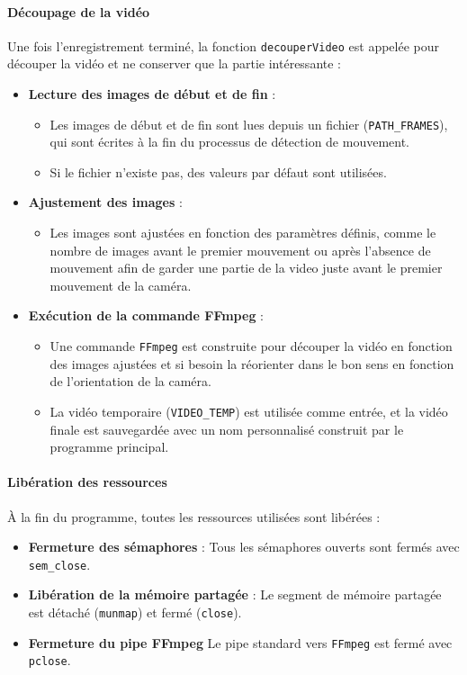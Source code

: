 \documentclass[a4paper, 11pt, french]{article}
\begin{document}
\paragraph{Découpage de la vidéo}
Une fois l'enregistrement terminé, la fonction \texttt{decouperVideo} est appelée pour découper la vidéo et ne conserver que la partie intéressante :
\begin{itemize}
    \item \textbf{Lecture des images de début et de fin} :
    \begin{itemize}
        \item Les images de début et de fin sont lues depuis un fichier (\texttt{PATH\_FRAMES}), qui sont écrites à la fin du processus de détection de mouvement.
        \item Si le fichier n'existe pas, des valeurs par défaut sont utilisées.
    \end{itemize}
    \item \textbf{Ajustement des images} :
    \begin{itemize}
        \item Les images sont ajustées en fonction des paramètres définis, comme le nombre de images avant le premier mouvement ou après l'absence de mouvement afin de garder une partie de la video juste avant le premier mouvement de la caméra. 
    \end{itemize}
    \item \textbf{Exécution de la commande FFmpeg} :
    \begin{itemize}
        \item Une commande \texttt{FFmpeg} est construite pour découper la vidéo en fonction des images ajustées et si besoin la réorienter dans le bon sens en fonction de l'orientation de la caméra.
        \item La vidéo temporaire (\texttt{VIDEO\_TEMP}) est utilisée comme entrée, et la vidéo finale est sauvegardée avec un nom personnalisé construit par le programme principal.
    \end{itemize}
\end{itemize}

\paragraph{Libération des ressources}
À la fin du programme, toutes les ressources utilisées sont libérées :
\begin{itemize}
    \item \textbf{Fermeture des sémaphores} : Tous les sémaphores ouverts sont fermés avec \texttt{sem\_close}.
    \item \textbf{Libération de la mémoire partagée} : Le segment de mémoire partagée est détaché (\texttt{munmap}) et fermé (\texttt{close}).
    \item \textbf{Fermeture du pipe FFmpeg} Le pipe standard vers \texttt{FFmpeg} est fermé avec \texttt{pclose}.
\end{itemize}
\end{document}
